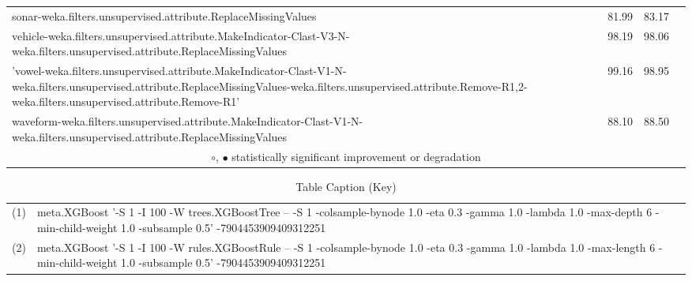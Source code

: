 \begin{table}[thb]
{\begin{tabular}{lrr@{\hspace{0.1cm}}c}
sonar-weka.filters.unsupervised.attribute.ReplaceMissingValues &  81.99 &  83.17 &         \\
vehicle-weka.filters.unsupervised.attribute.MakeIndicator-Clast-V3-N-weka.filters.unsupervised.attribute.ReplaceMissingValues &  98.19 &  98.06 &         \\
'vowel-weka.filters.unsupervised.attribute.MakeIndicator-Clast-V1-N-weka.filters.unsupervised.attribute.ReplaceMissingValues-weka.filters.unsupervised.attribute.Remove-R1,2-weka.filters.unsupervised.attribute.Remove-R1' &  99.16 &  98.95 &         \\
waveform-weka.filters.unsupervised.attribute.MakeIndicator-Clast-V1-N-weka.filters.unsupervised.attribute.ReplaceMissingValues &  88.10 &  88.50 &         \\
\hline
\multicolumn{4}{c}{$\circ$, $\bullet$ statistically significant improvement or degradation}\\
\end{tabular} \footnotesize \par}
\end{table}


\begin{table}[thb]
\caption{\label{labelname}Table Caption (Key)}
\scriptsize
{\centering
\begin{tabular}{cl}\\
(1) & meta.XGBoost '-S 1 -I 100 -W trees.XGBoostTree -- -S 1 -colsample-bynode 1.0 -eta 0.3 -gamma 1.0 -lambda 1.0 -max-depth 6 -min-child-weight 1.0 -subsample 0.5' -7904453909409312251 \\
(2) & meta.XGBoost '-S 1 -I 100 -W rules.XGBoostRule -- -S 1 -colsample-bynode 1.0 -eta 0.3 -gamma 1.0 -lambda 1.0 -max-length 6 -min-child-weight 1.0 -subsample 0.5' -7904453909409312251 \\
\end{tabular}
}
\end{table}

